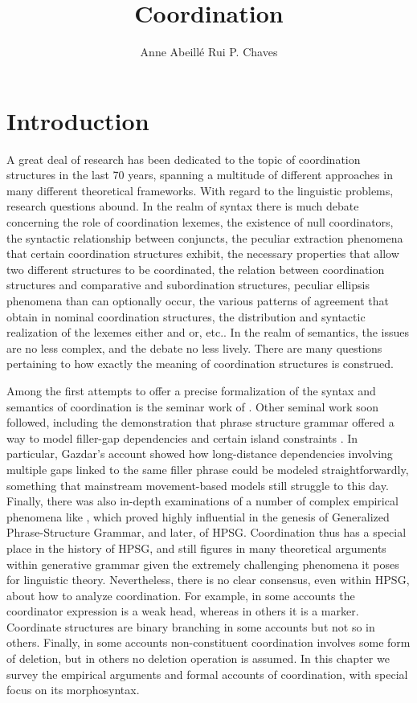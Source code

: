 \documentclass[output=paper]{langsci/langscibook}
\author{Anne Abeill\'{e}\affiliation{Laboratoire de Linguistique Formelle, University of Paris} \lastand Rui P. Chaves\affiliation{Linguistics Department, University at Buffalo, The State University of New York}}
\title{Coordination}
\begin{document}
\label{chap-coordination}



\section{Introduction} 

A great deal of research has been dedicated to the topic of coordination structures in the last  70 years, spanning a multitude of different approaches in many different theoretical frameworks.  With regard to the linguistic problems, research questions abound. In the realm of syntax there is much debate concerning the role of coordination lexemes, the existence of null coordinators, the syntactic relationship between conjuncts, the peculiar extraction phenomena that certain coordination structures exhibit, the necessary properties that allow two different structures to be coordinated, the relation between coordination structures and comparative and subordination structures, peculiar ellipsis phenomena than can optionally occur, the various
patterns of agreement that obtain in nominal coordination structures, the distribution and syntactic realization of the lexemes either and or, etc.. In the realm of semantics, the issues are no less complex, and the debate no less lively. There are many questions pertaining to how exactly the meaning of coordination structures is construed. 

Among the first attempts to offer a precise formalization of the syntax and semantics of coordination is the seminar work of \citet{gazdarc}. Other seminal work soon followed, including the demonstration that phrase structure grammar offered a way to model filler-gap dependencies and certain island constraints \citep{gazdar}. In particular, Gazdar's account showed how long-distance dependencies involving multiple gaps linked to the same filler phrase could be modeled straightforwardly, something that mainstream movement-based models still struggle to this day. Finally, there was also 
 in-depth examinations of a number of complex empirical phenomena like  \citet{gazd1982}, which  proved highly influential in the genesis of Generalized Phrase-Structure Grammar, and later, of HPSG. Coordination thus has a special place in the history of HPSG, and still figures  in many theoretical arguments within generative grammar  given the extremely challenging phenomena it poses for linguistic theory. 
Nevertheless, there is no clear consensus, even within HPSG, about how to analyze coordination. For example, in some accounts the coordinator
expression is a weak head, whereas in others it is a marker. Coordinate structures are binary branching in some accounts but not so in others. Finally, in  some accounts non-constituent coordination involves some form of deletion, but in others no deletion operation is assumed.  
In this chapter we survey the empirical arguments and formal accounts of coordination, with special focus on its morphosyntax.
\end{document}
